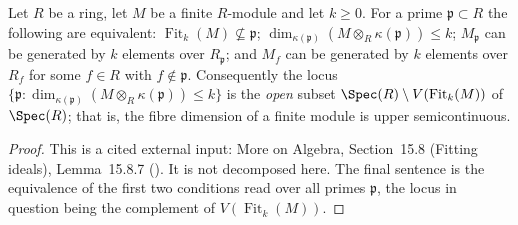 \begin{lemma}
\label{lem:pc-fitting-fibre-dimension}
Let $R$ be a ring, let $M$ be a finite $R$-module and let $k\ge0$.  For a prime
$\mathfrak p\subset R$ the following are equivalent:
$\operatorname{Fit}_k(M)\not\subseteq\mathfrak p$;
$\dim_{\kappa(\mathfrak p)}(M\otimes_R\kappa(\mathfrak p))\le k$;
$M_{\mathfrak p}$ can be generated by $k$ elements over $R_{\mathfrak p}$;
and $M_f$ can be generated by $k$ elements over $R_f$ for some $f\in R$ with
$f\notin\mathfrak p$.  Consequently the locus
$\{\mathfrak p:\dim_{\kappa(\mathfrak p)}(M\otimes_R\kappa(\mathfrak
p))\le k\}$ is the \emph{open} subset
$\Spec(R)\setminus V(\operatorname{Fit}_k(M))$ of $\Spec(R)$; that is, the
fibre dimension of a finite module is upper semicontinuous.
\end{lemma}
\begin{proof}
This is a cited external input: More on Algebra, Section~15.8 (Fitting ideals),
Lemma~15.8.7 ().  It is not decomposed here.  The final
sentence is the equivalence of the first two conditions read over all primes
$\mathfrak p$, the locus in question being the complement of
$V(\operatorname{Fit}_k(M))$.
\end{proof}


